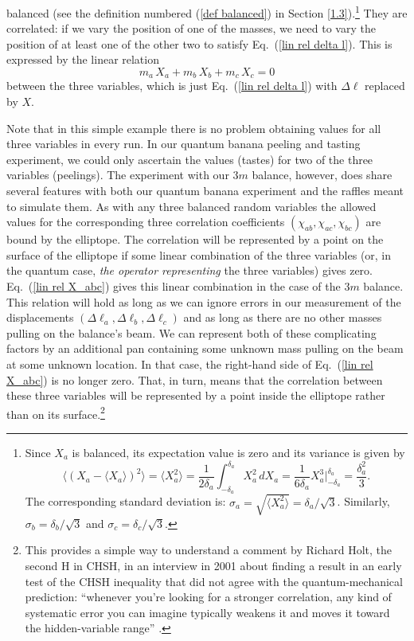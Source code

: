 balanced (see the definition numbered (\ref{def balanced}) in Section \ref{1.3}).\footnote{Since $X_a$ is balanced, its expectation value is zero and its variance is given by
\begin{equation*}
\langle (X_a - \langle X_a \rangle)^2 \rangle = \langle X_a^2 \rangle = \frac{1}{2\delta_a} \int_{-\delta_a}^{\delta_a} \!\! X_a^2 \, dX_a =  \frac{1}{6\delta_a} X_a^3 \Big|_{-\delta_a}^{\delta_a} = \frac{\delta_a^2}{3}.
\label{variance 3M variable} 
\end{equation*}
The corresponding standard deviation is: $\sigma_a \! = \! \sqrt{\langle X_a^2 \rangle} \! = \! \delta_a/\sqrt{3}$. Similarly, $\sigma_b  \! = \!  \delta_b/\sqrt{3}$ and $\sigma_c  \! = \!   \delta_c/\sqrt{3}$.\label{3M balance SDs}} They are correlated: if we vary the position of one of the masses, we need to vary the position of at least one of the other two to satisfy Eq.\ (\ref{lin rel delta l}). This is expressed by the linear relation
\begin{equation}
m_a \, X_a + m_b \, X_b + m_c \, X_c  = 0
\label{lin rel X_abc}
\end{equation}
between the three variables, which is just Eq.\ (\ref{lin rel delta l}) with $\Delta \ell$ replaced by $X$.

Note that in this simple example there is no problem obtaining values for all three variables in every run. In our quantum banana peeling and tasting experiment, we could only ascertain the values (tastes) for two of the three variables (peelings). The experiment with our 3$m$ balance, however, does share several features with both our quantum banana experiment and the raffles meant to simulate them. As with any three balanced random variables the allowed values for the corresponding three correlation coefficients $(\chi_{ab}, \chi_{ac}, \chi_{bc})$ are bound by the elliptope. The correlation will be represented by a point on the surface of the elliptope if some linear combination of the three variables (or, in the quantum case, \emph{the operator representing} the three variables) gives zero. Eq.\ (\ref{lin rel X_abc}) gives this linear combination in the case of the 3$m$ balance. This relation will hold as long as we can ignore errors in our measurement of the displacements $(\Delta \ell_a, \Delta \ell_b, \Delta \ell_c)$ and as long as there are no other masses pulling on the balance's beam. We can represent both of these complicating factors by an additional pan containing some unknown mass pulling on the beam at some unknown location. In that case, the right-hand side of Eq.\ (\ref{lin rel X_abc}) is no longer zero. That, in turn, means that the correlation between these three variables will be represented by a point inside the elliptope rather than on its surface.\footnote{This provides a simple way to understand a comment by Richard Holt, the second H in CHSH, in an interview in 2001 about finding a result in an early test of the CHSH inequality that did not agree with the quantum-mechanical prediction: ``whenever you're looking for a stronger correlation, any kind of systematic error you can imagine typically weakens it and moves it toward the hidden-variable range'' \citep[p.\ 286]{Gilder 2008}.} 

